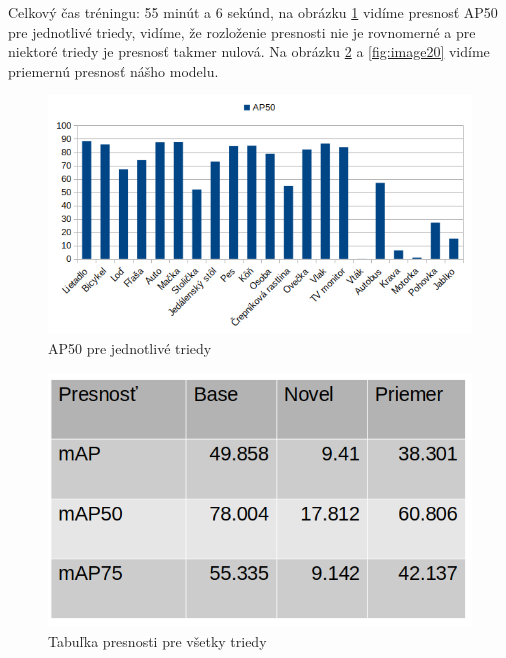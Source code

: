 Celkový čas tréningu: 55 minút a 6 sekúnd, na obrázku \ref{fig:image18} vidíme presnosť AP50 pre jednotlivé triedy, vidíme, že rozloženie presnosti nie je rovnomerné a pre niektoré triedy je presnosť takmer nulová. Na obrázku \ref{fig:image19} a \ref{fig:image20} vidíme priemernú presnosť nášho modelu.

\begin{figure}[H]
\includegraphics[width=\textwidth]{images/1_shot_classes_AP50.png}
\centering
\caption{AP50 pre jednotlivé triedy}
\label{fig:image18}
\end{figure}

\begin{figure}[H]
\includegraphics[width=\textwidth]{images/1shot_table_meanAP.png}
\centering
\caption{Tabuľka presnosti pre všetky triedy}
\label{fig:image19}
\end{figure}

